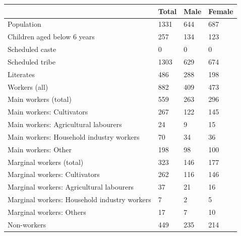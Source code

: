 \documentclass{article}
\begin{document}
\begin{tabular}{llll}
\toprule
 & Total & Male & Female \\
\midrule
Population & 1331 & 644 & 687 \\
Children aged below 6 years & 257 & 134 & 123 \\
Scheduled caste & 0 & 0 & 0 \\
Scheduled tribe & 1303 & 629 & 674 \\
Literates & 486 & 288 & 198 \\
Workers (all) & 882 & 409 & 473 \\
Main workers (total) & 559 & 263 & 296 \\
Main workers: Cultivators & 267 & 122 & 145 \\
Main workers: Agricultural labourers & 24 & 9 & 15 \\
Main workers: Household industry workers & 70 & 34 & 36 \\
Main workers: Other & 198 & 98 & 100 \\
Marginal workers (total) & 323 & 146 & 177 \\
Marginal workers: Cultivators & 262 & 116 & 146 \\
Marginal workers: Agricultural labourers & 37 & 21 & 16 \\
Marginal workers: Household industry workers & 7 & 2 & 5 \\
Marginal workers: Others & 17 & 7 & 10 \\
Non-workers & 449 & 235 & 214 \\
\bottomrule
\end{tabular}
\end{document}

